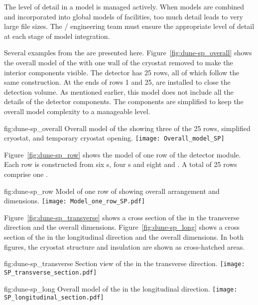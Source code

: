 The level of detail in a model is managed actively. When models are
combined and incorporated into global models of facilities, too much
detail leads to very large file sizes.  The /
engineering team must ensure the appropriate level of detail at each
stage of model integration.


Several examples from the  are presented
here. Figure~\ref{fig:dune-sp_overall} shows the overall model of the
 with one wall of the cryostat removed to make the
interior components visible. The detector has 25 rows, all of which
follow the same construction. At the ends of rows 1 and 25,
 are installed to close the detection volume.  As mentioned
earlier, this model does not include all the details of the detector
components. The components are simplified to keep the overall model
complexity to a manageable level.
\begin{dunefigure}{fig:dune-sp_overall}
  {Overall model of the  showing three of the 25 rows,
    simplified cryostat,  and temporary cryostat opening.}
  \texttt{[image: Overall\_model\_SP]}
\end{dunefigure} 


Figure~\ref{fig:dune-sp_row} shows the model of one row of the
detector module. Each row is constructed from six s, four
s and eight  and . A total of 25 rows
comprise one .
\begin{dunefigure}{fig:dune-sp_row}
  {Model of one row of  showing overall arrangement and dimensions.}
  \texttt{[image: Model\_one\_row\_SP.pdf]}
\end{dunefigure}


Figure~\ref{fig:dune-sp_transverse} shows a cross section of the
 in the transverse direction and the overall dimensions.
Figure~\ref{fig:dune-sp_long} shows a cross section of the
 in the longitudinal direction and the overall
dimensions. In both figures, the cryostat structure and insulation are
shown as cross-hatched areas.
\begin{dunefigure}{fig:dune-sp_transverse}
  {Section view of the  in the transverse
    direction.}
  \texttt{[image: SP\_transverse\_section.pdf]}
\end{dunefigure}
\begin{dunefigure}{fig:dune-sp_long}
  {Overall model of the  in the longitudinal direction.}
  \texttt{[image: SP\_longitudinal\_section.pdf]}
\end{dunefigure}



